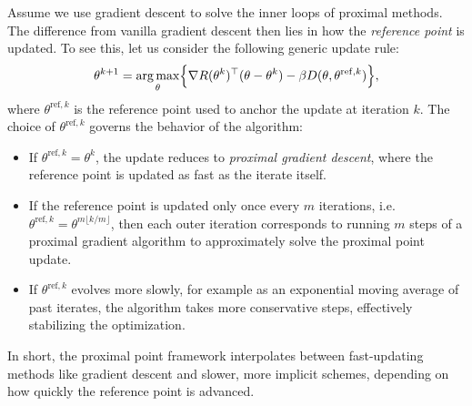 \documentclass[letterpaper,11pt]{article}
\begin{document}
\begin{remark}
Assume we use gradient descent to solve the inner loops of proximal methods. The difference from vanilla gradient descent then lies in how the \emph{reference point} is updated. To see this, let us consider the following generic update rule:
\[
\theta^{k+1} 
= \operatorname*{arg\,max}_\theta \Bigl\{ \nabla R(\theta^k)^\top (\theta - \theta^k) 
- \beta D(\theta, \theta^{\mathrm{ref},k}) \Bigr\},
\]
where $\theta^{\mathrm{ref},k}$ is the reference point used to anchor the update at iteration $k$.
%
The choice of $\theta^{\mathrm{ref},k}$ governs the behavior of the algorithm:
\begin{itemize}
\item If $\theta^{\mathrm{ref},k} = \theta^k$, the update reduces to \emph{proximal gradient descent}, where the reference point is updated as fast as the iterate itself.  

\item If the reference point is updated only once every $m$ iterations, 
i.e.\ $\theta^{\mathrm{ref},k} = \theta^{m\lfloor k/m \rfloor}$, 
then each outer iteration corresponds to running $m$ steps of a proximal 
gradient algorithm to approximately solve the proximal point update.

\item If $\theta^{\mathrm{ref},k}$ evolves more slowly, for example as an exponential moving average of past iterates, the algorithm takes more conservative steps, effectively stabilizing the optimization. 


\end{itemize}

In short, the proximal point framework interpolates between fast-updating methods like gradient descent and slower, more implicit schemes, depending on how quickly the reference point is advanced.
\end{remark}



\end{document}
